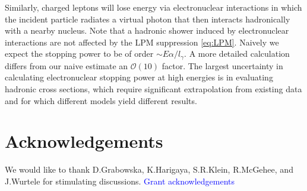 \documentclass[twocolumn,showpacs,preprintnumbers,amsmath,amssymb,prd]{revtex4}
\newcommand{\OO}{\mathcal{O}}
\begin{document}
\begin{appendices}
Similarly, charged leptons will lose energy via electronuclear interactions in which the incident particle radiates a virtual photon that then interacts hadronically with a nearby nucleus.
Note that a hadronic shower induced by electronuclear interactions are not affected by the LPM suppression \eqref{eq:LPM}.
Naively we expect the stopping power to be of order $\sim E \alpha/l_\gamma$.
A more detailed calculation \cite{Gerhardt:2010bj} differs from our naive estimate an $\OO(10)$ factor.
The largest uncertainty in calculating electronuclear stopping power at high energies is in evaluating hadronic cross sections, which require significant extrapolation from existing data and for which different models yield different results.

\end{appendices}

\section*{Acknowledgements}
We would like to thank D.Grabowska, K.Harigaya, S.R.Klein, R.McGehee, and J.Wurtele for stimulating discussions.
\textcolor{blue}{Grant acknowledgements}


\end{document}
